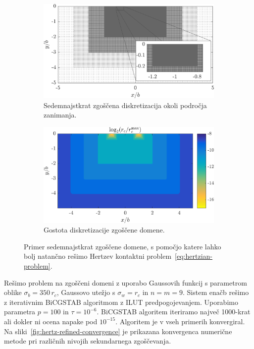 \documentclass[12pt,a4paper,twoside]{article}
\theoremstyle{definition} %
\theoremstyle{plain} %
\numberwithin{equation}{section}
\begin{document}
\begin{figure}[h]
  \centering
  \begin{subfigure}[t]{0.45\textwidth}
    \includegraphics[width=\textwidth]{images/hertzian_refined_domain.png}
    \caption[Sedemnajstkrat zgoščena diskretizacija.]{Sedemnajstkrat zgoščena diskretizacija okoli področja zanimanja.}
    \label{fig:hertz-refined-domain}
  \end{subfigure}
  \begin{subfigure}[t]{0.45\textwidth}
    \includegraphics[width=\textwidth]{images/hertzian_refined_domain_density.png}
    \caption[Gostota diskretizacije zgoščene domene.]{Gostota diskretizacije zgoščene domene.}
    \label{fig:hertz-refined-domain-density}
  \end{subfigure}
  \caption[Primer zgoščene domene, s katero rešujemo kontaktni problem.]{Primer sedemnajstkrat
    zgoščene domene, s pomočjo katere lahko bolj natančno rešimo Hertzev kontaktni
    problem~\eqref{eq:hertzian-problem}.}
  \label{fig:hertz-refined-domain-together}
\end{figure}

Rešimo problem na zgoščeni domeni z uporabo Gaussovih funkcij s parametrom oblike $\sigma_b = 350\,
r_c$, Gaussovo utežjo s $\sigma_w = r_c$ in $n = m = 9$. Sistem enačb rešimo z iterativnim
BiCGSTAB algoritmom z ILUT predpogojevanjem. Uporabimo parametra $p=100$ in $\tau = 10^{-6}$.
BiCGSTAB algoritem iteriramo največ 1000-krat ali dokler ni ocena napake pod $10^{-15}$.
Algoritem je v vseh primerih konvergiral. Na sliki~\ref{fig:hertz-refined-convergence} je prikazana
konvergenca numerične metode pri različnih nivojih sekundarnega zgoščevanja.
\end{document}
